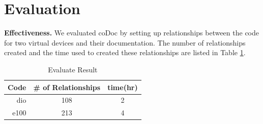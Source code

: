 \documentclass[conference]{IEEEtran}
\begin{document}
%





\section{Evaluation}
\label{sec:evaluation}


\textbf{Effectiveness.} We evaluated coDoc by setting up relationships between the code for two virtual devices and their documentation.
The number of relationships created and the time used to created these relationships are listed in Table \ref{table:evaluate}.

\begin{table}[th]
\caption{Evaluate Result}
\centering
\begin{tabular}{rcc}
\hline
Code & \# of Relationships & time(hr) \\
\hline
dio & 108 & 2 \\
e100  & 213 & 4\\
\hline
\end{tabular}
\label{table:evaluate}
\end{table}
\end{document}
